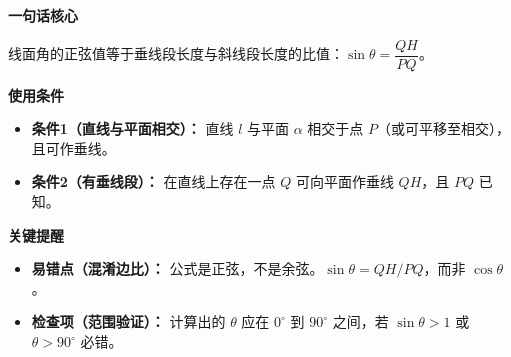 \begin{summarybox}
	\textbf{\textcolor{CSummary}{一句话核心}}

	线面角的正弦值等于垂线段长度与斜线段长度的比值：$\sin\theta = \dfrac{QH}{PQ}$。

	\medskip
	\textbf{\textcolor{CSummary}{使用条件}}
	\begin{itemize}[leftmargin=*, itemsep=0.5em, topsep=0.4em]
		\item \textbf{条件1（直线与平面相交）：} 直线 $l$ 与平面 $\alpha$ 相交于点 $P$（或可平移至相交），且可作垂线。
		\item \textbf{条件2（有垂线段）：} 在直线上存在一点 $Q$ 可向平面作垂线 $QH$，且 $PQ$ 已知。
	\end{itemize}

	\medskip
	\textbf{\textcolor{CSummary}{关键提醒}}
	\begin{itemize}[leftmargin=*, itemsep=0.5em, topsep=0.4em]
		\item \textbf{易错点（混淆边比）：} 公式是正弦，不是余弦。$\sin\theta = QH/PQ$，而非 $\cos\theta$。
		\item \textbf{检查项（范围验证）：} 计算出的 $\theta$ 应在 $0^\circ$ 到 $90^\circ$ 之间，若 $\sin\theta > 1$ 或 $\theta > 90^\circ$ 必错。
	\end{itemize}
\end{summarybox}
